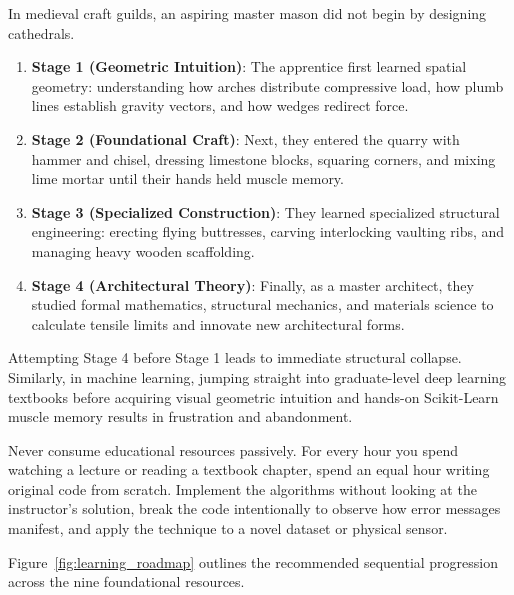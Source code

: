 \begin{analogy}
In medieval craft guilds, an aspiring master mason did not begin by designing cathedrals. 

\begin{enumerate}
    \item \textbf{Stage 1 (Geometric Intuition)}: The apprentice first learned spatial geometry: understanding how arches distribute compressive load, how plumb lines establish gravity vectors, and how wedges redirect force.
    \item \textbf{Stage 2 (Foundational Craft)}: Next, they entered the quarry with hammer and chisel, dressing limestone blocks, squaring corners, and mixing lime mortar until their hands held muscle memory.
    \item \textbf{Stage 3 (Specialized Construction)}: They learned specialized structural engineering: erecting flying buttresses, carving interlocking vaulting ribs, and managing heavy wooden scaffolding.
    \item \textbf{Stage 4 (Architectural Theory)}: Finally, as a master architect, they studied formal mathematics, structural mechanics, and materials science to calculate tensile limits and innovate new architectural forms.
\end{enumerate}

Attempting Stage 4 before Stage 1 leads to immediate structural collapse. Similarly, in machine learning, jumping straight into graduate-level deep learning textbooks before acquiring visual geometric intuition and hands-on Scikit-Learn muscle memory results in frustration and abandonment.
\end{analogy}

\begin{keyidea}
Never consume educational resources passively. For every hour you spend watching a lecture or reading a textbook chapter, spend an equal hour writing original code from scratch. Implement the algorithms without looking at the instructor's solution, break the code intentionally to observe how error messages manifest, and apply the technique to a novel dataset or physical sensor.
\end{keyidea}

Figure~\ref{fig:learning_roadmap} outlines the recommended sequential progression across the nine foundational resources.

